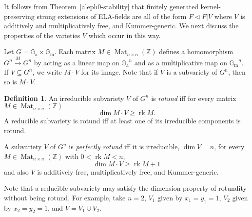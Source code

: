 \documentclass[12pt]{amsart}
\theoremstyle{definition}
\newtheorem{defn}[prop]{Definition}
\begin{document}
It follows from Theorem~\ref{aleph0-stability} that finitely generated kernel-preserving strong extensions of ELA-fields are all of the form $F {\ensuremath{\lhd}} F|V$ where $V$ is additively and multiplicatively free, and {Kummer-generic}. We next discuss the properties of the varieties $V$ which occur in this way.

Let $G = {\ensuremath{\mathbb{G}_\mathrm{a}}} {\ensuremath{\times}} {\ensuremath{\mathbb{G}_\mathrm{m}}}$. Each matrix $M \in \operatorname{Mat}_{n {\ensuremath{\times}} n}({\ensuremath{\mathbb{Z}}})$ defines a homomorphism
${\ensuremath{{G^n} \stackrel{{M}}{\longrightarrow} {G^n}}}$ by acting as a linear map on ${\ensuremath{\mathbb{G}_\mathrm{a}}}^n$ and as a
multiplicative map on ${\ensuremath{\mathbb{G}_\mathrm{m}}}^n$. If $V {\subseteq} G^n$, we write $M\cdot V$
for its image. Note that if $V$ is a subvariety of $G^n$, then so is $M\cdot
V$.
\begin{defn}
  An irreducible subvariety $V$ of $G^n$ is \emph{rotund} iff for
  every matrix $M \in \operatorname{Mat}_{n {\ensuremath{\times}} n}({\ensuremath{\mathbb{Z}}})$
  \[\dim M\cdot V {\ensuremath{\geqslant}} \operatorname{rk} M.\]
  A reducible subvariety is rotund iff at least one of its
  irreducible components is rotund.

  A subvariety $V$ of $G^n$ is \emph{perfectly rotund} iff it is
  irreducible, $\dim V = n$, for every $M \in \operatorname{Mat}_{n {\ensuremath{\times}}
    n}({\ensuremath{\mathbb{Z}}})$ with $ 0 < \operatorname{rk} M < n$,
  \[\dim M\cdot V {\ensuremath{\geqslant}} \operatorname{rk} M + 1\]
and also $V$ is additively free, multiplicatively free, and {Kummer-generic}.
\end{defn}
Note that a reducible subvariety may satisfy the dimension property of
rotundity without being rotund. For example, take $n=2$, $V_1$ given by $x_1
= y_1 = 1$, $V_2$ given by $x_2 = y_2 = 1$, and $V = V_1 \cup V_2$.
\end{document}

